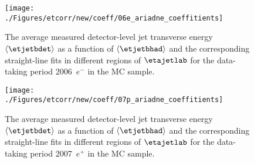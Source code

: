 \begin{figure}[p]
\centering
\texttt{[image: ./Figures/etcorr/new/coeff/06e\_ariadne\_coeffitients]}
\caption{The average measured detector-level jet transverse energy $\left\langle\etjetbdet\right\rangle$ as a function of $\left\langle\etjetbhad\right\rangle$ and the corresponding straight-line fits in different regions of $\etajetlab$ for the data-taking period 2006~$e^-$ in the \ariadne MC sample.}
\label{fig:05e_lepto_coeffitients}
\end{figure}

\begin{figure}[p]
\centering
\texttt{[image: ./Figures/etcorr/new/coeff/07p\_ariadne\_coeffitients]}
\caption{The average measured detector-level jet transverse energy $\left\langle\etjetbdet\right\rangle$ as a function of $\left\langle\etjetbhad\right\rangle$ and the corresponding straight-line fits in different regions of $\etajetlab$ for the data-taking period 2007~$e^+$ in the \ariadne MC sample.}
\label{fig:05e_lepto_coeffitients}
\end{figure}